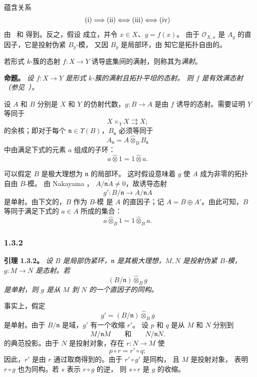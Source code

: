 蕴含关系
\[
  \textup{(i)}\Longrightarrow\textup{(ii)}
  \Longleftrightarrow\textup{(iii)}
  \Longleftrightarrow\textup{(iv)}
\]
由 \,\textup{}
和  得到。反之，假设
\textup{} 成立，并令 \(x\in X\)、\(y=f(x)\)。
由于 \(\mathcal O_{X,x}\) 是 \(A_y\) 的直因子，它是投射伪紧 \(B_y\)-模，
又因 \(B_y\) 是局部环，由  知它是拓扑自由的。

若形式 \(k\)-簇的态射 \(f:X\to Y\) 诱导底集间的满射，则称其为\emph{满射}。

\medskip
\noindent\textbf{命题。}
\label{sga3:VIIB:1.3.1.effective-epi}
{\itshape 设 \(f:X\to Y\) 是形式 \(k\)-簇的满射且拓扑平坦的态射。
则 \(f\) 是有效满态射\textup{（参见\ ）}。}

设 \(A\) 和 \(B\) 分别是 \(X\) 和 \(Y\) 的仿射代数，\(g:B\to A\)
是由 \(f\) 诱导的态射。需要证明 \(Y\) 等同于
\[
  X\times_YX\rightrightarrows X;
\]
的余核；即对于每个 \(\mathfrak n\in\Upsilon(B)\)，\(B_{\mathfrak n}\) 必须等同于
\[
  A_{\mathfrak n}
  =
  A\widehat{\otimes}_B B_{\mathfrak n}
\]
中由满足下式的元素 \(a\) 组成的子环：
\[
  a\widehat{\otimes}1=1\widehat{\otimes}a.
\]

可以假定 \(B\) 是极大理想为 \(\mathfrak n\) 的局部环。
这时假设意味着 \(g\) 使 \(A\) 成为非零的拓扑自由 \(B\)-模。
由 Nakayama ，
\(A/\overline{\mathfrak nA}\ne0\)，故诱导态射
\[
  g':B/\mathfrak n\longrightarrow
     A/\overline{\mathfrak nA}
\]
是单射。由下文的，\(B\) 作为 \(B\)-模
是 \(A\) 的直因子；记 \(A=B\oplus A'\)。由此可知，\(B\) 等同于满足下式的
\(a\in A\) 所成的集合：
\[
  a\widehat{\otimes}_B1
  =
  1\widehat{\otimes}_B a.
\]

\subsubsection*{1.3.2}
\label{sga3:VIIB:1.3.2}

\noindent\textbf{引理 1.3.2。}
{\itshape 设 \(B\) 是局部伪紧环，\(\mathfrak n\) 是其极大理想，\(M,N\) 是投射伪紧
\(B\)-模，\(g:M\to N\) 是态射。若
\[
  (B/\mathfrak n)\widehat{\otimes}_B g
\]
是单射，则 \(g\) 是从 \(M\) 到 \(N\) 的一个直因子的同构。}

事实上，假定
\[
  g'=(B/\mathfrak n)\widehat{\otimes}_B g
\]
是单射。由于 \(B/\mathfrak n\) 是域，\(g'\) 有一个收缩 \(r'\)。
设 \(p\) 和 \(q\) 是从 \(M\) 和 \(N\) 分别到
\[
  M/\overline{\mathfrak nM}
  \qquad\text{和}\qquad
  N/\overline{\mathfrak nN}.
\]
的典范投影。由于 \(N\) 是投射对象，存在 \(r:N\to M\) 使
\[
  p\circ r=r'\circ q;
\]
因此，\(r'\) 是由 \(r\) 通过取商得到的。由于 \(r'\circ g'\) 是同构，
且 \(M\) 是投射对象， 表明
\(r\circ g\) 也为同构。若 \(s\) 表示 \(r\circ g\) 的逆，
则 \(s\circ r\) 是 \(g\) 的收缩。

